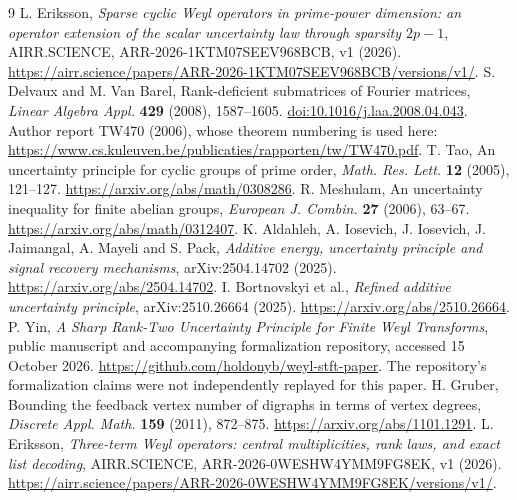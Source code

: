 \documentclass[11pt,a4paper]{article}
\theoremstyle{remark}\newtheorem{remark}[theorem]{Remark}
\begin{document}
\begin{thebibliography}{9}
 L. Eriksson, \emph{Sparse cyclic Weyl operators in prime-power dimension: an operator extension of the scalar uncertainty law through sparsity $2p-1$}, AIRR.SCIENCE, ARR-2026-1KTM07SEEV968BCB, v1 (2026). \url{https://airr.science/papers/ARR-2026-1KTM07SEEV968BCB/versions/v1/}.
 S. Delvaux and M. Van Barel, Rank-deficient submatrices of Fourier matrices, \emph{Linear Algebra Appl.} \textbf{429} (2008), 1587--1605. \href{https://doi.org/10.1016/j.laa.2008.04.043}{doi:10.1016/j.laa.2008.04.043}. Author report TW470 (2006), whose theorem numbering is used here: \url{https://www.cs.kuleuven.be/publicaties/rapporten/tw/TW470.pdf}.
 T. Tao, An uncertainty principle for cyclic groups of prime order, \emph{Math. Res. Lett.} \textbf{12} (2005), 121--127. \url{https://arxiv.org/abs/math/0308286}.
 R. Meshulam, An uncertainty inequality for finite abelian groups, \emph{European J. Combin.} \textbf{27} (2006), 63--67. \url{https://arxiv.org/abs/math/0312407}.
 K. Aldahleh, A. Iosevich, J. Iosevich, J. Jaimangal, A. Mayeli and S. Pack, \emph{Additive energy, uncertainty principle and signal recovery mechanisms}, arXiv:2504.14702 (2025). \url{https://arxiv.org/abs/2504.14702}.
 I. Bortnovskyi et al., \emph{Refined additive uncertainty principle}, arXiv:2510.26664 (2025). \url{https://arxiv.org/abs/2510.26664}.
 P. Yin, \emph{A Sharp Rank-Two Uncertainty Principle for Finite Weyl Transforms}, public manuscript and accompanying formalization repository, accessed 15 October 2026. \url{https://github.com/holdonyb/weyl-stft-paper}. The repository's formalization claims were not independently replayed for this paper.
 H. Gruber, Bounding the feedback vertex number of digraphs in terms of vertex degrees, \emph{Discrete Appl. Math.} \textbf{159} (2011), 872--875. \url{https://arxiv.org/abs/1101.1291}.
 L. Eriksson, \emph{Three-term Weyl operators: central multiplicities, rank laws, and exact list decoding}, AIRR.SCIENCE, ARR-2026-0WESHW4YMM9FG8EK, v1 (2026). \url{https://airr.science/papers/ARR-2026-0WESHW4YMM9FG8EK/versions/v1/}.
\end{thebibliography}
\end{document}
